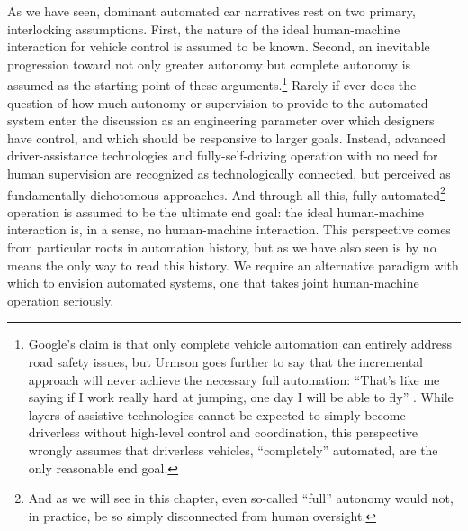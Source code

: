 As we have seen, dominant automated car narratives rest on two primary,
interlocking assumptions. First, the nature of the 
ideal human-machine interaction for vehicle control is assumed to be
known. Second, an inevitable progression toward not only greater
autonomy but complete autonomy is assumed as the
starting point of these arguments.\footnote{Google's claim is that only complete
vehicle automation can entirely address road safety issues, but Urmson
goes further to say that the incremental approach will 
never achieve the necessary full automation: ``That's like me saying
if I work really hard at jumping, one day I will be able to fly''
\cite{friedGoogle}.
While layers of assistive technologies cannot be expected to simply become
driverless without high-level control and coordination, this perspective wrongly
assumes that driverless vehicles, ``completely'' automated, are the
only reasonable end goal.} Rarely if ever does the question of
how much autonomy or supervision to provide to the automated system
enter the discussion as an engineering parameter over which designers
have control, and which should be responsive to larger goals. Instead,
advanced driver-assistance technologies and fully-self-driving
operation with no need for human supervision are recognized as
technologically connected, but perceived as fundamentally dichotomous
approaches. And through all this,
fully automated\footnote{And as we will see in this chapter, even
  so-called ``full'' autonomy would not, in practice, be so simply
  disconnected from human oversight.} operation is assumed to be the
ultimate end goal: the ideal human-machine
interaction is, in a sense, no human-machine interaction. This
perspective comes from particular roots in automation history, but as
we have also seen is
by no means the only way to read this history. We require an
alternative paradigm with which to envision automated
systems, one that takes joint human-machine operation seriously. 






